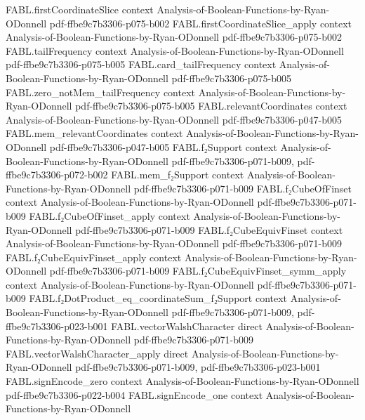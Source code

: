 \begin{theorem}
\proofstep
  {FABL.firstCoordinateSlice}
  {context}
  {Analysis-of-Boolean-Functions-by-Ryan-ODonnell}
  {pdf-ffbe9c7b3306-p075-b002}
\proofstep
  {FABL.firstCoordinateSlice_apply}
  {context}
  {Analysis-of-Boolean-Functions-by-Ryan-ODonnell}
  {pdf-ffbe9c7b3306-p075-b002}
\proofstep
  {FABL.tailFrequency}
  {context}
  {Analysis-of-Boolean-Functions-by-Ryan-ODonnell}
  {pdf-ffbe9c7b3306-p075-b005}
\proofstep
  {FABL.card_tailFrequency}
  {context}
  {Analysis-of-Boolean-Functions-by-Ryan-ODonnell}
  {pdf-ffbe9c7b3306-p075-b005}
\proofstep
  {FABL.zero_notMem_tailFrequency}
  {context}
  {Analysis-of-Boolean-Functions-by-Ryan-ODonnell}
  {pdf-ffbe9c7b3306-p075-b005}
\proofstep
  {FABL.relevantCoordinates}
  {context}
  {Analysis-of-Boolean-Functions-by-Ryan-ODonnell}
  {pdf-ffbe9c7b3306-p047-b005}
\proofstep
  {FABL.mem_relevantCoordinates}
  {context}
  {Analysis-of-Boolean-Functions-by-Ryan-ODonnell}
  {pdf-ffbe9c7b3306-p047-b005}
\proofstep
  {FABL.f₂Support}
  {context}
  {Analysis-of-Boolean-Functions-by-Ryan-ODonnell}
  {pdf-ffbe9c7b3306-p071-b009,
    pdf-ffbe9c7b3306-p072-b002}
\proofstep
  {FABL.mem_f₂Support}
  {context}
  {Analysis-of-Boolean-Functions-by-Ryan-ODonnell}
  {pdf-ffbe9c7b3306-p071-b009}
\proofstep
  {FABL.f₂CubeOfFinset}
  {context}
  {Analysis-of-Boolean-Functions-by-Ryan-ODonnell}
  {pdf-ffbe9c7b3306-p071-b009}
\proofstep
  {FABL.f₂CubeOfFinset_apply}
  {context}
  {Analysis-of-Boolean-Functions-by-Ryan-ODonnell}
  {pdf-ffbe9c7b3306-p071-b009}
\proofstep
  {FABL.f₂CubeEquivFinset}
  {context}
  {Analysis-of-Boolean-Functions-by-Ryan-ODonnell}
  {pdf-ffbe9c7b3306-p071-b009}
\proofstep
  {FABL.f₂CubeEquivFinset_apply}
  {context}
  {Analysis-of-Boolean-Functions-by-Ryan-ODonnell}
  {pdf-ffbe9c7b3306-p071-b009}
\proofstep
  {FABL.f₂CubeEquivFinset_symm_apply}
  {context}
  {Analysis-of-Boolean-Functions-by-Ryan-ODonnell}
  {pdf-ffbe9c7b3306-p071-b009}
\proofstep
  {FABL.f₂DotProduct_eq_coordinateSum_f₂Support}
  {context}
  {Analysis-of-Boolean-Functions-by-Ryan-ODonnell}
  {pdf-ffbe9c7b3306-p071-b009,
    pdf-ffbe9c7b3306-p023-b001}
\proofstep
  {FABL.vectorWalshCharacter}
  {direct}
  {Analysis-of-Boolean-Functions-by-Ryan-ODonnell}
  {pdf-ffbe9c7b3306-p071-b009}
\proofstep
  {FABL.vectorWalshCharacter_apply}
  {direct}
  {Analysis-of-Boolean-Functions-by-Ryan-ODonnell}
  {pdf-ffbe9c7b3306-p071-b009,
    pdf-ffbe9c7b3306-p023-b001}
\proofstep
  {FABL.signEncode_zero}
  {context}
  {Analysis-of-Boolean-Functions-by-Ryan-ODonnell}
  {pdf-ffbe9c7b3306-p022-b004}
\proofstep
  {FABL.signEncode_one}
  {context}
  {Analysis-of-Boolean-Functions-by-Ryan-ODonnell}

\end{theorem}
